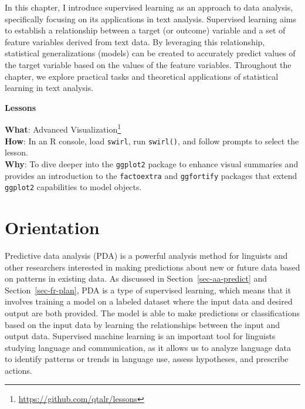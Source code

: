 \documentclass[
  letterpaper,
]{latex/krantz}
\theoremstyle{definition}
\theoremstyle{remark}
\DeclareRobustCommand{\href}[2]{#2\footnote{\url{#1}}}
\begin{document}
In this chapter, I introduce supervised learning as an approach to data
analysis, specifically focusing on its applications in text analysis.
Supervised learning aims to establish a relationship between a target
(or outcome) variable and a set of feature variables derived from text
data. By leveraging this relationship, statistical generalizations
(models) can be created to accurately predict values of the target
variable based on the values of the feature variables. Throughout the
chapter, we explore practical tasks and theoretical applications of
statistical learning in text analysis.

\begin{tcolorbox}[enhanced jigsaw, toprule=.15mm, breakable, colback=white, opacityback=0, leftrule=.75mm, bottomrule=.15mm, colframe=quarto-callout-color-frame, left=2mm, arc=.35mm, rightrule=.15mm]

\textbf{ Lessons}

\textbf{What}: \href{https://github.com/qtalr/lessons}{Advanced
Visualization}\\
\textbf{How}: In an R console, load \texttt{swirl}, run
\texttt{swirl()}, and follow prompts to select the lesson.\\
\textbf{Why}: To dive deeper into the \texttt{ggplot2} package to
enhance visual summaries and provides an introduction to the
\texttt{factoextra} and \texttt{ggfortify} packages that extend
\texttt{ggplot2} capabilities to model objects.

\end{tcolorbox}

\section{Orientation}\label{sec-pda-orientation}

Predictive data analysis (PDA) is a powerful analysis method for
linguists and other researchers interested in making predictions about
new or future data based on patterns in existing data. As discussed in
Section~\ref{sec-aa-predict} and Section~\ref{sec-fr-plan}, PDA is a
type of supervised learning, which means that it involves training a
model on a labeled dataset where the input data and desired output are
both provided. The model is able to make predictions or classifications
based on the input data by learning the relationships between the input
and output data. Supervised machine learning is an important tool for
linguists studying language and communication, as it allows us to
analyze language data to identify patterns or trends in language use,
assess hypotheses, and prescribe actions.
\end{document}

